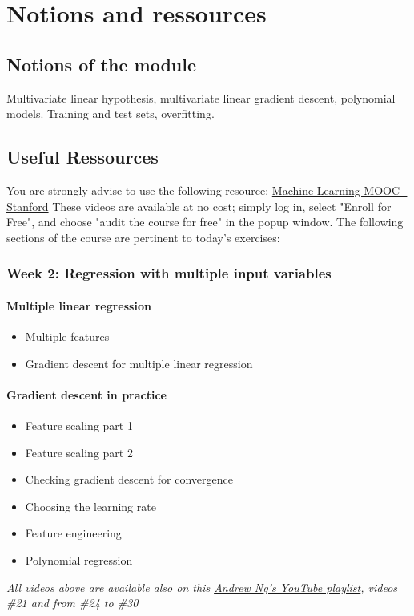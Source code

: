 

\chapter*{Notions and ressources}

\section*{Notions of the module}
Multivariate linear hypothesis, multivariate linear gradient descent, polynomial models. 
Training and test sets, overfitting.

\section*{Useful Ressources}

You are strongly advise to use the following resource:
\href{https://www.coursera.org/learn/machine-learning}{Machine Learning MOOC - Stanford}
These videos are available at no cost; simply log in, select "Enroll for Free", and choose "audit the course for free" in the popup window.
The following sections of the course are pertinent to today's exercises:

\subsection*{Week 2: Regression with multiple input variables}

\subsubsection*{Multiple linear regression}
\begin{itemize}
  \item Multiple features
  \item Gradient descent for multiple linear regression
\end{itemize}

\subsubsection*{Gradient descent in practice}
\begin{itemize}
  \item Feature scaling part 1
  \item Feature scaling part 2
  \item Checking gradient descent for convergence
  \item Choosing the learning rate
  \item Feature engineering
  \item Polynomial regression
\end{itemize}


\emph{All videos above are available also on this \href{https://youtube.com/playlist?list=PLkDaE6sCZn6FNC6YRfRQc_FbeQrF8BwGI&feature=shared}{Andrew Ng's YouTube playlist}, videos \#21 and from \#24 to \#30}